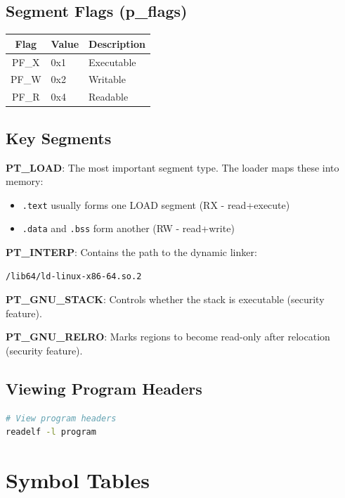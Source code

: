 \subsection{Segment Flags (p\_flags)}

\begin{tabular}{|c|l|l|}
\hline
\textbf{Flag} & \textbf{Value} & \textbf{Description} \\
\hline
PF\_X & 0x1 & Executable \\
\hline
PF\_W & 0x2 & Writable \\
\hline
PF\_R & 0x4 & Readable \\
\hline
\end{tabular}

\subsection{Key Segments}

\textbf{PT\_LOAD}: The most important segment type. The loader maps these into memory:
\begin{itemize}
    \item \texttt{.text} usually forms one LOAD segment (RX - read+execute)
    \item \texttt{.data} and \texttt{.bss} form another (RW - read+write)
\end{itemize}

\textbf{PT\_INTERP}: Contains the path to the dynamic linker:
\begin{verbatim}
/lib64/ld-linux-x86-64.so.2
\end{verbatim}

\textbf{PT\_GNU\_STACK}: Controls whether the stack is executable (security feature).

\textbf{PT\_GNU\_RELRO}: Marks regions to become read-only after relocation (security feature).

\subsection{Viewing Program Headers}

\begin{lstlisting}[language=bash]
# View program headers
readelf -l program
\end{lstlisting}

\section{Symbol Tables}

